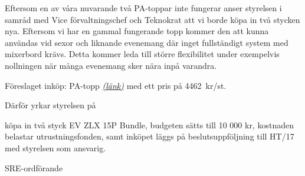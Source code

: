 \documentclass[../_main/handlingar.tex]{subfiles}
\begin{document}

Eftersom en av våra nuvarande två PA-toppar inte fungerar anser styrelsen i samråd med Vice förvaltningschef och Teknokrat att vi borde köpa in två stycken nya. Eftersom vi har en gammal fungerande topp kommer den att kunna användas vid sexor och liknande evenemang där inget fullständigt system med mixerbord krävs. Detta kommer leda till större flexibilitet under exempelvis nollningen när många evenemang sker nära inpå varandra.

Föreslaget inköp: PA-topp \href{https://www.thomann.de/se/ev_zlx_15p_bundle_2.htm?ref=search_rslt_EV+ZLX+15P_340452_2}{\textit{(länk)}} med ett pris på \SI{4462}{kr/st}.

Därför yrkar styrelsen på

\begin{attsatser}
    \att köpa in två styck EV ZLX 15P Bundle,
    \att budgeten sätts till 10 000 kr,
    \att kostnaden belastar utrustningsfonden, samt
    \att inköpet läggs på beslutsuppföljning till HT/17 med styrelsen som ansvarig.
\end{attsatser}

\begin{signatures}{1}
    \ist
    \signature{\sreordf}{SRE-ordförande}
\end{signatures}
\end{document}
